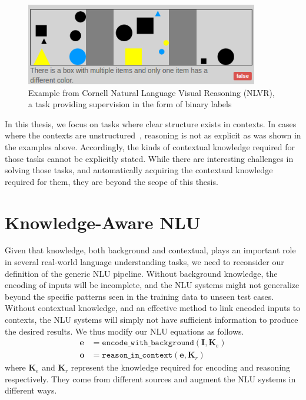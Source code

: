 \begin{figure}
	\begin{center}
	\includegraphics[width=4in]{figures/nlvr_example.png}
	\caption{Example from Cornell Natural Language Visual Reasoning (NLVR), a task providing supervision in the form of binary labels}\label{fig:nlvr_example_intro}
	\end{center}
\end{figure}

In this thesis, we focus on tasks where clear structure exists in contexts. In cases where the contexts are unstructured~\citep{hill2015goldilocks,richardson2013mctest,penas2013qa4mre,breck2001looking},
reasoning is not as explicit as was shown in the examples above. Accordingly, the kinds of contextual
knowledge required for those tasks cannot be explicitly stated.
While there are interesting challenges in solving those tasks, and automatically acquiring the contextual knowledge required for them,
they are beyond the scope of this thesis.

\section{Knowledge-Aware NLU}
Given that knowledge, both background and contextual, plays an important role in several real-world language understanding tasks, we need to reconsider
our definition of the generic NLU pipeline.
Without background knowledge, the encoding of inputs will be incomplete, and the NLU systems might not generalize beyond the specific patterns 
seen in the training data to unseen test cases. Without contextual knowledge, and an effective method to link encoded inputs to contexts, the NLU
systems will simply not have sufficient information to produce the desired results. We thus modify our NLU equations as follows.
\begin{align}
 \mathbf{e} &= \mathtt{encode\_with\_background}(\mathbf{I}, \mathbf{K}_e) \label{eq:encoding_with_knowledge}\\
	\mathbf{o} &= \mathtt{reason\_in\_context}(\mathbf{e}, \mathbf{K}_r) \label{eq:reasoning_with_knowledge}
\end{align}
where $\mathbf{K}_e$ and $\mathbf{K}_r$ represent the knowledge required for encoding and reasoning respectively. They
come from different sources and augment the NLU systems in different ways.

